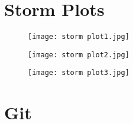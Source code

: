 \documentclass[]{article}
\begin{document}
\section{Storm Plots}
\begin{figure}[ht]
    \centering
    \texttt{[image: storm plot1.jpg]}
    \caption{}
\end{figure}

\begin{figure}[ht]
    \centering
    \texttt{[image: storm plot2.jpg]}
    \caption{}
\end{figure}

\begin{figure}[ht]
    \centering
    \texttt{[image: storm plot3.jpg]}
    \caption{}
\end{figure}
\section{Git}
\end{document}
